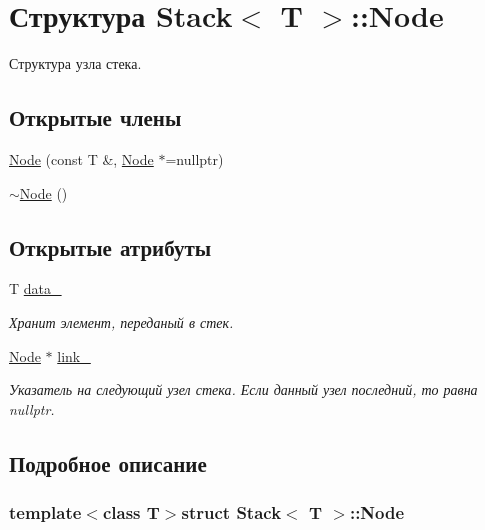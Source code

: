 \hypertarget{struct_stack_1_1_node}{}\section{Структура Stack$<$ T $>$\+:\+:Node}
\label{struct_stack_1_1_node}


Структура узла стека.  


\subsection*{Открытые члены}
\begin{DoxyCompactItemize}
\item 
\hyperlink{struct_stack_1_1_node_a4445b3cf66e0fa32593297de69bff358}{Node} (const T \&, \hyperlink{struct_stack_1_1_node}{Node} $\ast$=nullptr)
\item 
\hyperlink{struct_stack_1_1_node_a8cccb15f2be544e90527524677286ba3}{$\sim$\+Node} ()
\end{DoxyCompactItemize}
\subsection*{Открытые атрибуты}
\begin{DoxyCompactItemize}
\item 
T \hyperlink{struct_stack_1_1_node_aad1bf4e68aae74727c28fa543573ef6b}{data\+\_\+}
\begin{DoxyCompactList}\small\item\em Хранит элемент, переданый в стек. \end{DoxyCompactList}\item 
\hyperlink{struct_stack_1_1_node}{Node} $\ast$ \hyperlink{struct_stack_1_1_node_a9d4f0632f74c398b88f3026649383394}{link\+\_\+}
\begin{DoxyCompactList}\small\item\em Указатель на следующий узел стека. Если данный узел последний, то равна nullptr. \end{DoxyCompactList}\end{DoxyCompactItemize}


\subsection{Подробное описание}
\subsubsection*{template$<$class T$>$struct Stack$<$ T $>$\+::\+Node}

